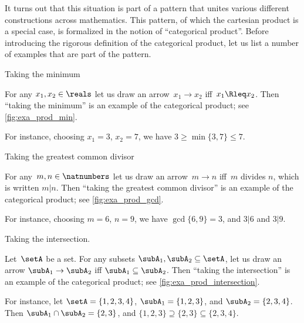 It turns out that this situation is part of a pattern that unites various different constructions across mathematics.
This pattern, of which the cartesian product is a special case, is formalized in the notion of ``categorical product''.
Before introducing the rigorous definition of the categorical product, let us list a number of examples that are part of the pattern.

\begin{marginfigure}
	\centering
	\caption{Taking the minimum}
	\label{fig:exa_prod_min}
\end{marginfigure}

\begin{example}
	\label{exa:min-as-prod}
	For any $x_1,x_2\in \reals$ let us draw an arrow~$x_1\to x_2$ iff~$x_1\Rleq x_2$.
	Then ``taking the minimum'' is an example of the categorical product; see \cref{fig:exa_prod_min}.

	For instance, choosing $x_1 = 3$, $x_2 = 7$, we have $3 \geq \min \{3, 7\} \leq 7$.
\end{example}

\begin{marginfigure}
	\centering
	\caption{Taking the greatest common divisor}
	\label{fig:exa_prod_gcd}
\end{marginfigure}

\begin{example}
	\label{exa:gcd-as-prod}
	For any~$m, n \in \natnumbers$ let us draw an arrow~$m \to n$ iff~$m$ divides $n$, which is written $m | n$.
	Then ``taking the greatest common divisor'' is an example of the categorical product; see \cref{fig:exa_prod_gcd}.

	For instance, choosing $m = 6$, $n = 9$, we have $\gcd \{6, 9 \} = 3$, and $3 | 6$ and $3 | 9$.
\end{example}

\begin{marginfigure}
	\centering
	\caption{Taking the intersection.}
	\label{fig:exa_prod_intersection}
\end{marginfigure}

\begin{example}
	\label{exa:intersection-as-prod}
	Let~$\setA$ be a set.
	For any subsets $\subA_1, \subA_2 \subseteq \setA$, let us draw an arrow $\subA_1 \to \subA_2$ iff $\subA_1 \subseteq \subA_2$.
	Then ``taking the intersection'' is an example of the categorical product; see \cref{fig:exa_prod_intersection}.

	For instance, let $\setA = \{ 1, 2, 3, 4 \}$, $\subA_1 = \{ 1, 2, 3 \}$, and $\subA_2 = \{2, 3, 4 \}$.
	Then $\subA_1 \cap \subA_2 = \{2, 3 \}$, and $\{ 1, 2, 3 \} \supseteq \{2, 3 \} \subseteq \{2, 3, 4 \}$.
\end{example}

